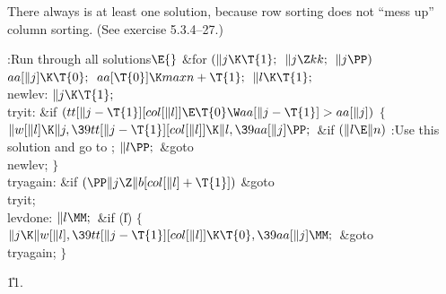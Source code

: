 There always is at least one solution, because row sorting does not
``mess up'' column sorting. (See exercise 5.3.4--27.)

\Y\B\4:Run through all solutions\X${}\E{}$\6
\&{for} ${}(\|j\K\T{1};{}$ ${}\|j\Z\\{kk};{}$ ${}\|j\PP){}$\1\5
${}\\{aa}[\|j]\K\T{0};{}$\2\6
${}\\{aa}[\T{0}]\K\\{maxn}+\T{1};{}$\6
${}\|l\K\T{1};{}$\6
\4\\{newlev}:\5
${}\|j\K\T{1};{}$\6
\4\\{tryit}:\5
\&{if} ${}(\\{tt}[\|j-\T{1}][\\{col}[\|l]]\E\T{0}\W\\{aa}[\|j-\T{1}]>\\{aa}[%
\|j]){}$\5
${}\{{}$\1\6
${}\|w[\|l]\K\|j,\39\\{tt}[\|j-\T{1}][\\{col}[\|l]]\K\|l,\39\\{aa}[\|j]\PP;{}$\6
\&{if} ${}(\|l\E\|n){}$\1\5
:Use this solution and go to \X;\2\6
${}\|l\PP;{}$\6
\&{goto} \\{newlev};\6
\4${}\}{}$\2\6
\4\\{tryagain}:\6
\&{if} ${}(\PP\|j\Z\|b[\\{col}[\|l]+\T{1}]){}$\1\5
\&{goto} \\{tryit};\2\6
\4\\{levdone}:\5
${}\|l\MM;{}$\6
\&{if} (\|l)\5
${}\{{}$\1\6
${}\|j\K\|w[\|l],\39\\{tt}[\|j-\T{1}][\\{col}[\|l]]\K\T{0},\39\\{aa}[\|j]%
\MM;{}$\6
\&{goto} \\{tryagain};\6
\4${}\}{}$\2\par
\U11.\fi

